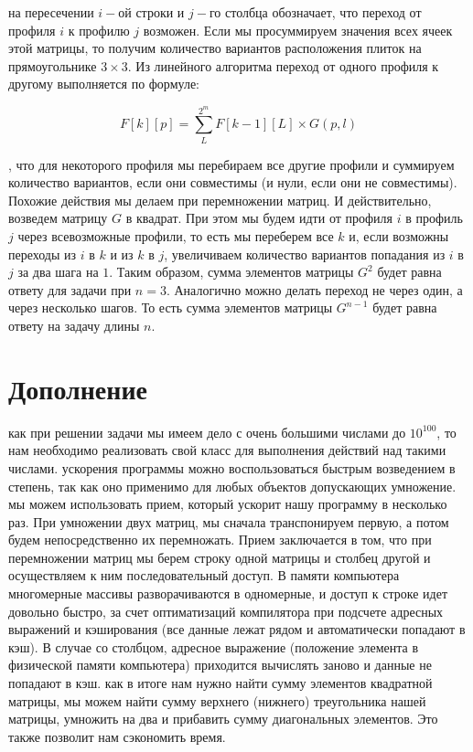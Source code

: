 \documentclass{article}
\begin{document}
 на пересечении $i-$ой строки и $j-$го столбца обозначает, что переход от профиля $i$ к профилю $j$ возможен. Если мы просуммируем значения всех ячеек этой матрицы, то получим количество вариантов расположения плиток на прямоугольнике $3 \times 3$. Из линейного алгоритма переход от одного профиля к другому выполняется по формуле: 

\[F[k][p] = \sum_{L}^{2^m} F[k - 1][L] \times G(p, l)\]

, что для некоторого профиля мы перебираем все другие профили и суммируем количество вариантов, если они совместимы (и нули, если они не совместимы). Похожие действия мы делаем при перемножении матриц. И действительно, возведем матрицу $G$ в квадрат. При этом мы будем идти от профиля $i$ в профиль $j$ через всевозможные профили, то есть мы переберем все $k$ и, если возможны переходы из $i$ в $k$ и из $k$ в $j$, увеличиваем количество вариантов попадания из $i$ в $j$ за два шага на $1$. Таким образом, сумма элементов матрицы $G^2$ будет равна ответу для задачи при $n = 3$. Аналогично можно делать переход не через один, а через несколько шагов. То есть сумма элементов матрицы $G^{n - 1}$ будет равна ответу на задачу длины $n$.

\newpage
\setcounter{page}{4}
\section*{Дополнение}
 как при решении задачи мы имеем дело с очень большими числами до $10^{100}$, то нам необходимо реализовать свой класс для выполнения действий над такими числами. 
 ускорения программы можно воспользоваться быстрым возведением в степень, так как оно применимо для любых объектов допускающих умножение. 
 мы можем использовать прием, который ускорит нашу программу в несколько раз. При умножении двух матриц, мы сначала транспонируем первую, а потом будем непосредственно их перемножать. Прием заключается в том, что при перемножении матриц мы берем строку одной матрицы и столбец другой и осуществляем к ним последовательный доступ. В памяти компьютера многомерные массивы разворачиваются в одномерные, и доступ к строке идет довольно быстро, за счет оптиматизаций компилятора при подсчете адресных выражений и кэширования (все данные лежат рядом и автоматически попадают в кэш). В случае со столбцом, адресное выражение (положение элемента в физической памяти компьютера) приходится вычислять заново и данные не попадают в кэш.
 как в итоге нам нужно найти сумму элементов квадратной матрицы, мы можем найти сумму верхнего (нижнего) треугольника нашей матрицы, умножить на два и прибавить сумму диагональных элементов. Это также позволит нам сэкономить время.
\end{document}
